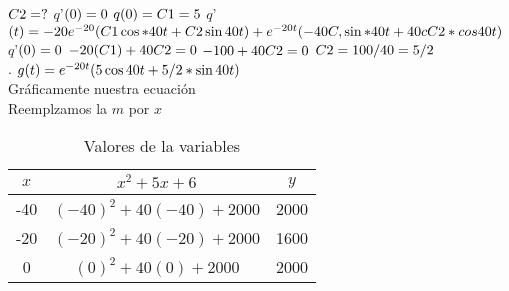 \documentclass[12pt,a4paper]{article}
\begin{document}
$C2=?\vspace{5mm}\\$
$q$’$(0)=0\vspace{5mm}\\$
$q(0) = C 1=5\vspace{5mm}\\$
$q$’$ (t) = - 20e ^{- 20} (C1 \cos * 40t +C2 \sin 40 t) 
+e^{-20t}(- 40C, \sin * 40t + 40c C2 * cos 40t)\vspace{5mm}\\$
$q$’$(0) =0\vspace{5mm}\\$
$- 20(C1) + 40C2 = 0\vspace{5mm}\\$
$- 100 + 40C2= 0\vspace{5mm}\\$
$ C2= 100/40 = 5/2\vspace{5mm}$\\$.$
$g(t) = e ^{- 20t} (5\cos 40t + 5/2 * \sin 40t)\vspace{5mm}$\\
Gráficamente nuestra ecuación\\
Reemplzamos la $m$ por $x$
\begin{table}[H]
		\centering
		\caption{Valores de la variables}
		\vspace{2.5mm}
	\begin{tabular}{c|c|c}
		$x$	&	$x^{2} + 5x +6$	& $y$\\
		\hline
		-40	&	$\left(-40\right)^{2} + 40\left(-40\right) +2000$	& 2000\\
		-20	&	$\left( -20\right)^{2} + 40\left( -20\right) +2000$	& 1600\\
		0	&	$\left( 0\right)^{2} + 40\left( 0\right) +2000$	& 2000\\
	\end{tabular}
	\end{table}

	\begin{figure}[H]
		\centering
	\end{figure} 
\end{document}
